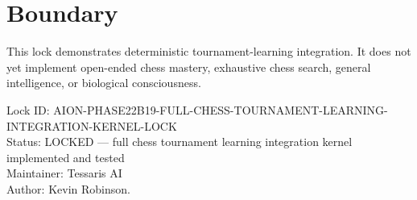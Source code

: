\documentclass[11pt,a4paper]{article}
\begin{document}
\section{Boundary}

This lock demonstrates deterministic tournament-learning integration. It does not yet implement open-ended chess mastery, exhaustive chess search, general intelligence, or biological consciousness.

\bigskip

\noindent
Lock ID: AION-PHASE22B19-FULL-CHESS-TOURNAMENT-LEARNING-INTEGRATION-KERNEL-LOCK\\
Status: LOCKED --- full chess tournament learning integration kernel implemented and tested\\
Maintainer: Tessaris AI\\
Author: Kevin Robinson.
\end{document}

